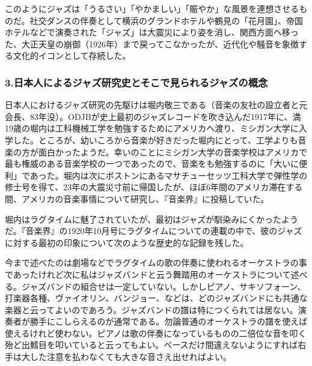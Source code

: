 このようにジャズは「うるさい」「やかましい」「賑やか」な風景を連想させるものだ。社交ダンスの伴奏として横浜のグランドホテルや鶴見の「花月園」、帝国ホテルなどで演奏された「ジャズ」は大震災により姿を消し、関西方面へ移った、大正天皇の崩御（1926年）まで戻ってこなかったが、近代化や騒音を象徴する文化的イコンとして存続した。

\subsubsection{3.日本人によるジャズ研究史とそこで見られるジャズの概念}

日本人におけるジャズ研究の先駆けは堀内敬三である（音楽の友社の設立者と元会長、83年没）。ODJBが史上最初のジャズレコードを吹き込んだ1917年に、満19歳の堀内は工科機械工学を勉強するためにアメリカへ渡り、ミシガン大学に入学した。ところが、幼いころから音楽が好きだった堀内にとって、工学よりも音楽の方が面白かったようだ。幸いのことにミシガン大学の音楽学校はアメリカで最も権威のある音楽学校の一つであったので、音楽をも勉強するのに「大いに便利」であった。堀内は次にボストンにあるマサチューセッツ工科大学で弾性学の修士号を得て、23年の大震災寸前に帰国したが、ほぼ6年間のアメリカ滞在する間、アメリカの音楽事情について研究し、『音楽界』に投稿していた。

堀内はラグタイムに魅了されていたが、最初はジャズが馴染みにくかったようだ。『音楽界』の1920年10月号にラグタイムについての連載の中で、彼のジャズに対する最初の印象について次のような歴史的な記録を残した。

\begin{gquote}
今まで述べたのは劇場などでラグタイムの歌の伴奏に使われるオーケストラの事であったけれど次に私はジャズバンドと云う舞踏用のオーケストラについて述べる。ジャズバンドの組合せは一定していない。しかしピアノ、サキソフォーン、打楽器各種、ヴァイオリン、バンジョー、などは、どのジャズバンドにも共通な楽器と云ってよいのであろう。ジャズバンドの譜は特につくられては居ない。演奏者が勝手にこしらえるのが通常である。勿論普通のオーケストラの譜を使えば使えるけれど使わない。ピアノは歌の伴奏になっているものの二倍位な音を叩く殆ど出鱈目を叩いていると云ってもよい。ベースだけ間違えないようにすれば右手は大した注意を払わなくても大きな音さえ出せればよい。
\end{gquote}

